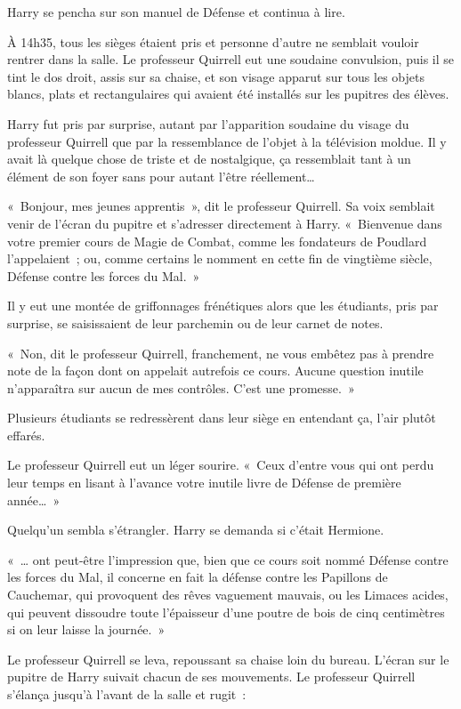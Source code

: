 Harry se pencha sur son manuel de Défense et continua à lire.

\later

À 14h35, tous les sièges étaient pris et personne d'autre ne semblait vouloir rentrer dans la salle. Le professeur Quirrell eut une soudaine convulsion, puis il se tint le dos droit, assis sur sa chaise, et son visage apparut sur tous les objets blancs, plats et rectangulaires qui avaient été installés sur les pupitres des élèves.

Harry fut pris par surprise, autant par l'apparition soudaine du visage du professeur Quirrell que par la ressemblance de l'objet à la télévision moldue. Il y avait là quelque chose de triste et de nostalgique, ça ressemblait tant à un élément de son foyer sans pour autant l'être réellement…

«~Bonjour, mes jeunes apprentis~», dit le professeur Quirrell. Sa voix semblait venir de l'écran du pupitre et s'adresser directement à Harry. «~Bienvenue dans votre premier cours de Magie de Combat, comme les fondateurs de Poudlard l'appelaient~; ou, comme certains le nomment en cette fin de vingtième siècle, Défense contre les forces du Mal.~»

Il y eut une montée de griffonnages frénétiques alors que les étudiants, pris par surprise, se saisissaient de leur parchemin ou de leur carnet de notes.

«~Non, dit le professeur Quirrell, franchement, ne vous embêtez pas à prendre note de la façon dont on appelait autrefois ce cours. Aucune question inutile n'apparaîtra sur aucun de mes contrôles. C'est une promesse.~»

Plusieurs étudiants se redressèrent dans leur siège en entendant ça, l'air plutôt effarés.

Le professeur Quirrell eut un léger sourire. «~Ceux d'entre vous qui ont perdu leur temps en lisant à l'avance votre inutile livre de Défense de première année…~»

Quelqu'un sembla s'étrangler. Harry se demanda si c'était Hermione.

«~… ont peut-être l'impression que, bien que ce cours soit nommé Défense contre les forces du Mal, il concerne en fait la défense contre les Papillons de Cauchemar, qui provoquent des rêves vaguement mauvais, ou les Limaces acides, qui peuvent dissoudre toute l'épaisseur d'une poutre de bois de cinq centimètres si on leur laisse la journée.~»

Le professeur Quirrell se leva, repoussant sa chaise loin du bureau. L'écran sur le pupitre de Harry suivait chacun de ses mouvements. Le professeur Quirrell s'élança jusqu'à l'avant de la salle et rugit~:

